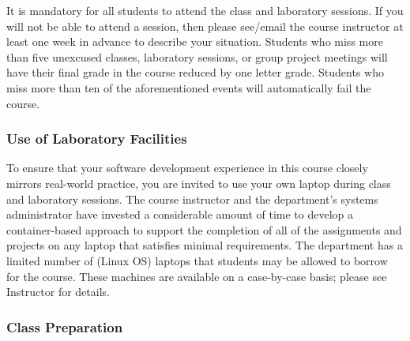\documentclass[11pt]{article} %
\begin{document}
It is mandatory for all students to attend the class and laboratory sessions. If you will not be able to attend a session, then please see/email the course instructor at least one week in advance to describe your situation.  Students who miss more than five unexcused classes, laboratory sessions, or group project meetings will have their final grade in the course reduced by one letter grade. Students who miss more than ten of the aforementioned events will automatically fail the course.

% 
% 


\subsubsection*{\textbf{Use of Laboratory Facilities}}


To ensure that your software development experience in this course closely mirrors real-world practice, you are invited to use your own laptop during class and laboratory sessions. The course instructor and the department's systems administrator have invested a considerable amount of time to develop a container-based approach to support the completion of all of the assignments and projects on any laptop that satisfies minimal requirements. The department has a limited number of (Linux OS) laptops that students may be allowed to borrow for the course. These machines are available on a case-by-case basis; please see Instructor for details.  %


\subsubsection*{\textbf{Class Preparation}}
\end{document}
